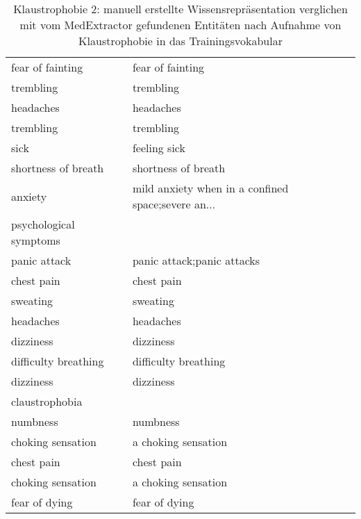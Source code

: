 \begin{table}[H]
\begin{center}
\begin{tabular}{ll}
      fear of fainting &                                   fear of fainting \\
             trembling &                                          trembling \\
             headaches &                                          headaches \\
             trembling &                                          trembling \\
                  sick &                                       feeling sick \\
   shortness of breath &                                shortness of breath \\
               anxiety & mild anxiety when in a confined space;severe an... \\
psychological symptoms &                                                    \\
          panic attack &                         panic attack;panic attacks \\
            chest pain &                                         chest pain \\
              sweating &                                           sweating \\
             headaches &                                          headaches \\
             dizziness &                                          dizziness \\
  difficulty breathing &                               difficulty breathing \\

             dizziness &                                          dizziness \\
        claustrophobia &                                                    \\
              numbness &                                           numbness \\
     choking sensation &                                a choking sensation \\
            chest pain &                                         chest pain \\
     choking sensation &                                a choking sensation \\
         fear of dying &                                      fear of dying \\
\bottomrule
\end{tabular}
\caption{Klaustrophobie 2: manuell erstellte Wissensrepräsentation verglichen mit vom MedExtractor gefundenen Entitäten nach Aufnahme von Klaustrophobie in das Trainingsvokabular}
\label{tab:claustrophobia_vergleich_manuell_medextractor}
\end{center}
\end{table}


